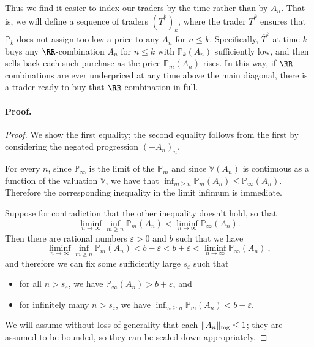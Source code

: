 \documentclass[authordate,onecolumn,noenvironments]{miri-tech-article}
\numberwithin{equation}{subsection}
\newcommand{\seq}[1]{{\overline{#1}}}
\newcommand{\nn}{n}
\newcommand{\aff}{A}
\newcommand{\trade}{T}%
\newcommand{\Trader}{\seq{\trade}} %
\newcommand{\magnit}[1]{{\|#1\|_{\rm mg}}} %
\newcommand{\BelState}{\mathbb{P}}
\newcommand{\Valuation}{\mathbb{V}}
\newcommand{\pt}{\BelState}
\newcommand{\localportfoliovalue}{b}
\begin{document}
Thus we find it easier to index our traders by the time rather than by $\aff_n$. That is, we will define  a sequence of traders $(\Trader^k)_k$, where
the trader $\Trader^k$
ensures that $\pt_k$ does not assign too low a price to any $\aff_n$ for $n \le k$. Specifically, $\Trader^k$ at time $k$
buys any $\RR$-combination $\aff_n$  for
$n \le k$ with $\pt_{k}(\aff_n)$ sufficiently low,
and then sells back each such purchase as the price
$\pt_{m}(\aff_n)$ rises. In this way, if $\RR$-combinations are ever underpriced at any time above the main
diagonal, there is a trader ready to buy that $\RR$-combination in full.  


\paragraph{Proof.}
\begin{proof}

  We show the first equality; the second equality follows from the first by considering the negated progression $(-\aff_n)_n$. 

For every $n$, since  $\pt_\infty$ is the limit of the $\pt_m$ and since $\Valuation(\aff_n)$ is continuous as a function of the valuation $\Valuation$, we have that $\inf_{m \ge n}\pt_{m}(\aff_n) 
\le \pt_{\infty}(\aff_{n})$. Therefore 
the corresponding inequality in the limit infimum is immediate. 

Suppose for contradiction that the other inequality doesn't hold, so that 
%
  \[
    \liminf_{\nn\to\infty}\inf_{m \ge n}\pt_{m}(\aff_n) < \liminf_{\nn\rightarrow\infty}\pt_{\infty}(\aff_{n}).
  \]
%
  Then there are rational numbers $\varepsilon>0$ and $\localportfoliovalue$  such that
we have 
%
\[  \liminf_{\nn\to\infty}\inf_{m \ge n}\pt_{m}(\aff_n)
<  \localportfoliovalue - \varepsilon<\localportfoliovalue + \varepsilon<  \liminf_{\nn\rightarrow\infty}\pt_{\infty}(\aff_{n})\ , \]
%  
  and therefore we
can fix some sufficiently large $s_\varepsilon$ such that 

%
\begin{itemize}
\item for all $n>s_\varepsilon$, we have  $\pt_{\infty}(\aff_{n})
> \localportfoliovalue + \varepsilon$, and 
\item for infinitely many $n>s_\varepsilon$, we have   $\inf_{m\ge n} \pt_{m}(\aff_n)<\localportfoliovalue - \varepsilon$.
\end{itemize}

We will assume without loss of generality that each $\magnit{\aff_n} \leq 1$; they are assumed to be bounded, so they can be scaled down appropriately.



\end{proof}
\end{document}
